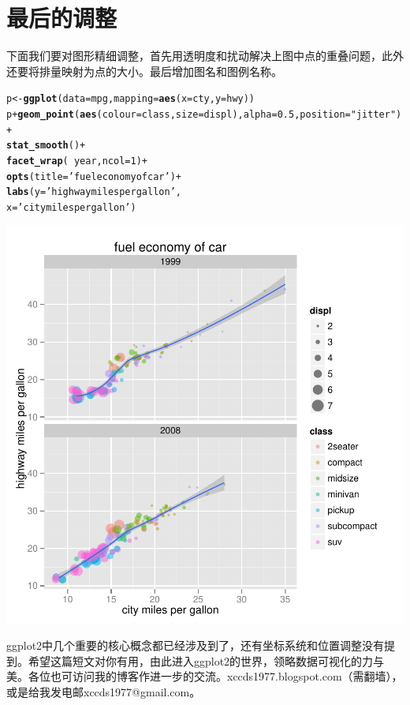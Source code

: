 \documentclass[UTF8,10pt]{ctexart}\usepackage{graphicx, color}
\makeatletter
\def\maxwidth{ %
  \ifdim\Gin@nat@width>\linewidth
    \linewidth
  \else
    \Gin@nat@width
  \fi
}
\newcommand{\hlfunctioncall}[1]{\textcolor[rgb]{0.501960784313725,0,0.329411764705882}{\textbf{#1}}}%
\newcommand{\hlstring}[1]{\textcolor[rgb]{0.6,0.6,1}{#1}}%
\newenvironment{kframe}{%
 \def\at@end@of@kframe{}%
 \ifinner\ifhmode%
  \def\at@end@of@kframe{\end{minipage}}%
  \begin{minipage}{\columnwidth}%
 \fi\fi%
 \def\FrameCommand##1{\hskip\@totalleftmargin \hskip-\fboxsep
 \colorbox{shadecolor}{##1}\hskip-\fboxsep
     \hskip-\linewidth \hskip-\@totalleftmargin \hskip\columnwidth}%
 \MakeFramed {\advance\hsize-\width
   \@totalleftmargin\z@ \linewidth\hsize
   \@setminipage}}%
 {\par\unskip\endMakeFramed%
 \at@end@of@kframe}
\newenvironment{knitrout}{}{} %
\makeatother
\begin{document}
\section{最后的调整}
下面我们要对图形精细调整，首先用透明度和扰动解决上图中点的重叠问题，此外还要将排量映射为点的大小。最后增加图名和图例名称。
\begin{knitrout}
\color{fgcolor}\begin{kframe}
\begin{alltt}
p <- \hlfunctioncall{ggplot}(data=mpg,mapping=\hlfunctioncall{aes}(x=cty,y=hwy))
p + \hlfunctioncall{geom_point}(\hlfunctioncall{aes}(colour=class,size=displ), alpha=0.5,position = \hlstring{"jitter"})+
    \hlfunctioncall{stat_smooth}()+
    \hlfunctioncall{facet_wrap}(~ year,ncol=1)+
    \hlfunctioncall{opts}(title=\hlstring{'fuel economy of car'})+
    \hlfunctioncall{labs}(y=\hlstring{'highway miles per gallon'},
         x=\hlstring{'city miles per gallon'})
\end{alltt}
\end{kframe}

{\centering \includegraphics[width=\maxwidth]{figure/unnamed-chunk-10} 

}


\end{knitrout}


ggplot2中几个重要的核心概念都已经涉及到了，还有坐标系统和位置调整没有提到。希望这篇短文对你有用，由此进入ggplot2的世界，领略数据可视化的力与美。各位也可访问我的博客作进一步的交流。xccds1977.blogspot.com（需翻墙），或是给我发电邮xccds1977@gmail.com。
\end{document}
